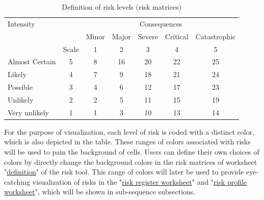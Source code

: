 \documentclass[10pt,halfline,a4paper]{ouparticle}
\begin{document}
\begin{table}
	\centering
	\caption{Definition of risk levels (risk matrices)}
	\begin{tabular}{l|l|l|l|l|l|l}
		\hline
		Intensity &  & \multicolumn{5}{c}{Consequences} \\ 
		\cline{3-7}
		&  & Minor & Major & Severe & Critical & Catastrophic \\ 
		\cline{3-7}
		& \multicolumn{1}{c|}{Scale} & \multicolumn{1}{c|}{1} & \multicolumn{1}{c|}{2} & \multicolumn{1}{c|}{3} & \multicolumn{1}{c|}{4} & \multicolumn{1}{c}{5} \\ 
		\hline
		Almost Certain & \multicolumn{1}{c|}{5} & \multicolumn{1}{c|}{\cellcolor{brown}\color{white}8} & \multicolumn{1}{c|}{\cellcolor{blue}\color{white}16} & \multicolumn{1}{c|}{\cellcolor{violet}\color{white}20} & \multicolumn{1}{c|}{\cellcolor{black}\color{white}22} & \multicolumn{1}{c}{\cellcolor{black}\color{white}25} \\ 
		\hline
		Likely & \multicolumn{1}{c|}{4} & \multicolumn{1}{c|}{\cellcolor{brown}\color{white}7} & \multicolumn{1}{c|}{\cellcolor{brown}\color{white}9} & \multicolumn{1}{c|}{\cellcolor{violet}\color{white}18} & \multicolumn{1}{c|}{\cellcolor{violet}\color{white}21} & \multicolumn{1}{c}{\cellcolor{black}\color{white}24} \\ 
		\hline
		Possible & \multicolumn{1}{c|}{3} & \multicolumn{1}{c|}{\cellcolor{green}\color{black}4} & \multicolumn{1}{c|}{\cellcolor{brown}\color{white}6} & \multicolumn{1}{c|}{\cellcolor{blue}\color{white}12} & \multicolumn{1}{c|}{\cellcolor{violet}\color{white}17} & \multicolumn{1}{c}{\cellcolor{black}\color{white}23} \\ 
		\hline
		Unlikely & \multicolumn{1}{c|}{2} & \multicolumn{1}{c|}{\cellcolor{green}\color{black}2} & \multicolumn{1}{c|}{\cellcolor{green}\color{black}5} & \multicolumn{1}{c|}{\cellcolor{brown}\color{white}11} & \multicolumn{1}{c|}{\cellcolor{blue}\color{white}15} & \multicolumn{1}{c}{\cellcolor{violet}\color{white}19} \\ 
		\hline
		Very unlikely & \multicolumn{1}{c|}{1} & \multicolumn{1}{c|}{\cellcolor{green}\color{black}1} & \multicolumn{1}{c|}{\cellcolor{green}\color{black}3} & \multicolumn{1}{c|}{\cellcolor{brown}\color{white}10} & \multicolumn{1}{c|}{\cellcolor{blue}\color{white}13} & \multicolumn{1}{c}{\cellcolor{blue}\color{white}14} \\ 
		\hline
	\end{tabular}
	\label{tbl_risks}
\end{table}
For the purpose of visualization, each level of risk is coded with a distinct color, which is also depicted in the table. These ranges of colors associated with risks will be used to pain the background of cells. Users can define their own choices of colors by directly change the background colors in the risk matrices of worksheet "\underline{definition}" of the risk tool. This range of colors will later be used to provide eye-catching visualization of risks in the "\underline{risk register worksheet}" and "\underline{risk profile worksheet}", which will be shown in sub-sequence subsections.
\end{document}
